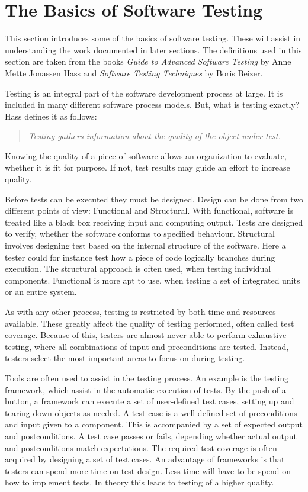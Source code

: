 \section{The Basics of Software Testing}\label{sect:btesting}
This section introduces some of the basics of software testing. These will assist in understanding the work documented in later sections. The definitions used in this section are taken from the books \textit{Guide to Advanced Software Testing} by Anne Mette Jonassen Hass\cite{Hass} and \textit{Software Testing Techniques} by Boris Beizer\cite{Beizer}.

Testing is an integral part of the software development process at large. It is included in many different software process models. But, what is testing exactly? Hass defines it as follows: 
 \begin{quotation} \textit{Testing gathers information about the quality of the object under test.}\end{quotation}  
Knowing the quality of a piece of software allows an organization to evaluate, whether it is fit for purpose. If not, test results may guide an effort to increase quality.

Before tests can be executed they must be designed.  Design can be done from two different points of view: Functional and Structural. With functional, software is treated like a black box receiving input and computing output. Tests are designed to verify, whether the software conforms to specified behaviour. Structural involves designing test based on the internal structure of the software. Here a tester could for instance test how a piece of code logically branches during execution. The structural approach is often used, when testing individual components. Functional is more apt to use, when testing a set of integrated units or an entire system. 

As with any other process, testing is restricted by both time and resources available. These greatly affect the quality of testing performed, often called test coverage. Because of this, testers are almost never able to perform exhaustive testing, where all combinations of input and preconditions are tested. Instead, testers select the most important areas to focus on during testing.  

Tools are often used to assist in the testing process. An example is the testing framework, which assist in the automatic execution of tests. By the push of a button, a framework can execute a set of user-defined test cases, setting up and tearing down objects as needed. A test case is a well defined set of preconditions and input given to a component. This is  accompanied by a set of expected output and postconditions. A test case passes or fails, depending whether actual output and postconditions match expectations.  The required test coverage is often acquired by designing a set of test cases. An advantage of frameworks is that testers can spend more time on test design. Less time will have to be spend on how to implement tests. In theory this leads to testing of a higher quality.


